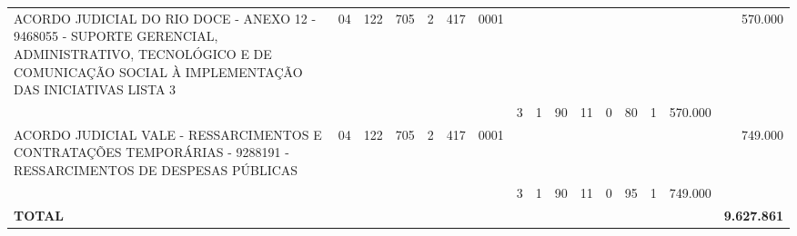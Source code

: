 \documentclass{article}
\begin{document}
\begin{longtable}[c]{m{6.5cm}|m{1pt}m{1pt}m{1pt}m{1pt}m{1pt}m{1pt}|m{1pt}m{1pt}m{0.5pt}m{1pt}|m{1pt}|m{1pt}m{1pt}|m{1pt}|m{2pt}}
\multicolumn{1}{L{5.5cm}|}{ ACORDO JUDICIAL DO RIO DOCE - ANEXO 12 - 9468055 - SUPORTE GERENCIAL, ADMINISTRATIVO, TECNOLÓGICO E DE COMUNICAÇÃO SOCIAL À IMPLEMENTAÇÃO DAS INICIATIVAS LISTA 3 } & \multicolumn{1}{c}{ 04 } & \multicolumn{1}{c}{ 122 } & \multicolumn{1}{c}{ 705 } & \multicolumn{1}{l}{ 2 } & \multicolumn{1}{c}{ 417 } & \multicolumn{1}{l|}{ 0001 } & & & & & & & & & \multicolumn{1}{r}{ 570.000 } \\
& & & & & & & \multicolumn{1}{c}{ 3 } & \multicolumn{1}{c}{ 1 } & \multicolumn{1}{c}{ 90 } & \multicolumn{1}{c|}{ 11 } & \multicolumn{1}{c|}{ 0 } & \multicolumn{1}{l}{ 80 } & \multicolumn{1}{c|}{ 1 } & \multicolumn{1}{r|}{ 570.000 } & \\
\multicolumn{1}{L{5.5cm}|}{ ACORDO JUDICIAL VALE - RESSARCIMENTOS E CONTRATAÇÕES TEMPORÁRIAS - 9288191  - RESSARCIMENTOS DE DESPESAS PÚBLICAS } & \multicolumn{1}{c}{ 04 } & \multicolumn{1}{c}{ 122 } & \multicolumn{1}{c}{ 705 } & \multicolumn{1}{l}{ 2 } & \multicolumn{1}{c}{ 417 } & \multicolumn{1}{l|}{ 0001 } & & & & & & & & & \multicolumn{1}{r}{ 749.000 } \\
& & & & & & & \multicolumn{1}{c}{ 3 } & \multicolumn{1}{c}{ 1 } & \multicolumn{1}{c}{ 90 } & \multicolumn{1}{c|}{ 11 } & \multicolumn{1}{c|}{ 0 } & \multicolumn{1}{l}{ 95 } & \multicolumn{1}{c|}{ 1 } & \multicolumn{1}{r|}{ 749.000 } & \\
\hline
\multicolumn{15}{C{6cm}|}{\textbf{ TOTAL }} & \multicolumn{1}{r}{\textbf{ 9.627.861 }} \\
\end{longtable}
\newpage
{}
{}
\renewcommand*{\arraystretch}{1.9}
\scriptsize
\color{myblack}
\centering
\end{document}
